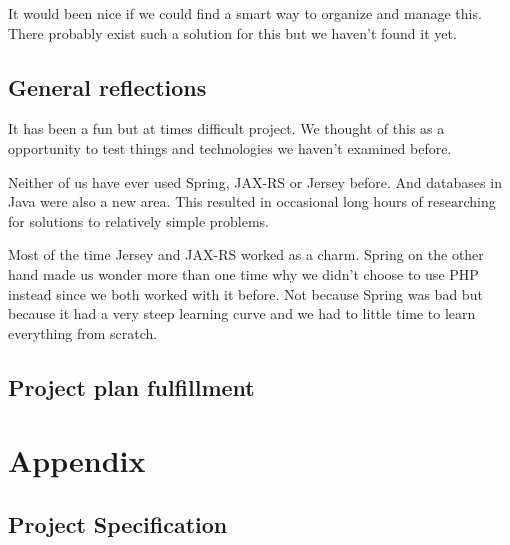 \documentclass[titlepage, twocolumn, a4paper, 10pt]{article}
\begin{document}
It would been nice if we could find a smart way to
organize and manage this. There probably exist such a
solution for this but we haven't found it yet.

\subsection{General reflections}\label{sec:reflections}
It has been a fun but at times difficult project. We thought of
this as a opportunity to test things and technologies we haven't
examined before.

Neither of us have ever used  Spring, JAX-RS or Jersey
before. And databases in Java were also a new area.
This resulted in occasional long hours of researching for
solutions to relatively simple problems.

Most of the time Jersey and JAX-RS worked as a charm.
Spring on the other hand made us wonder more than one time
why we didn't choose to use PHP instead since we both worked
with it before. Not because Spring was bad but because it had a
very steep learning curve and we had to little time to learn
everything from scratch.

\subsection{Project plan fulfillment}

% 
% 

\newpage
\onecolumn
\appendix
{}
\section{Appendix}\label{sec:app}
\subsection{Project Specification}\label{app:ps}
\newpage
\end{document}

